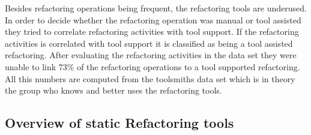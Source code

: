 Besides refactoring operations being frequent, the refactoring tools are underused. 
In order to decide whether the refactoring operation was manual or tool assisted they tried to correlate refactoring activities with tool support. 
If the refactoring activities is correlated with tool support it is classified as being a tool assisted refactoring.
After evaluating the refactoring activities in the data set they were unable to link 73\% of the refactoring operations to a tool supported refactoring. 
All this numbers are computed from the toolsmiths data set which is in theory the group who knows and better uses the refactoring tools.


\subsection{Overview of static Refactoring tools}
